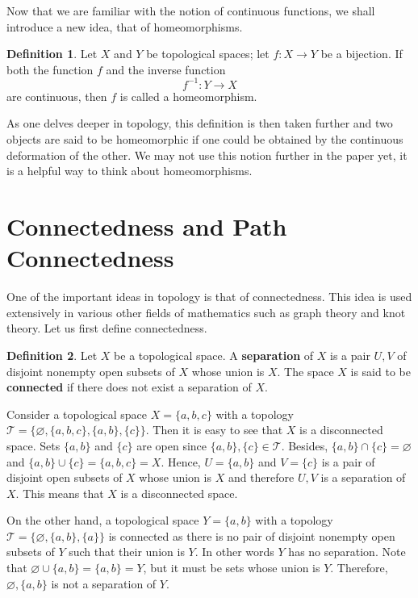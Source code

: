 \documentclass[a4paper, twocolumn]{article}
\newcommand{\topology}{\mathcal{T}}              %
\renewcommand{\emptyset}{\varnothing}            %
\newcommand\und[1]{\underline{\smash{#1}}}       %
\theoremstyle{definition}
\newtheorem*{definition}{Definition}
\begin{document}
\medskip

Now that we are familiar with the notion of continuous functions, we shall introduce a new idea, that of homeomorphisms.

\begin{definition}
\cite{7} Let $X$ and $Y$ be topological spaces; let $f : X \to Y$ be a bijection. If both the function $f$
and the inverse function
$$f^{-1} : Y \to X$$
are continuous, then $f$ is called a homeomorphism.
\end{definition}

As one delves deeper in topology, this definition is then taken further and two objects are said to be homeomorphic if
one could be obtained by the continuous deformation of the other. We may not use this notion further in the paper yet,
it is a helpful way to think about homeomorphisms.


\section*{\centering Connectedness and Path Connectedness}
One of the important ideas in topology is that of connectedness.
This idea is used extensively in various other fields of mathematics such as graph theory and knot theory.
Let us first define connectedness.

\begin{definition}
\cite{8} Let $X$ be a topological space. A \textbf{separation} of $X$ is a pair $U, V$ of disjoint
nonempty open subsets of $X$ whose union is $X$. The space $X$ is said to be \textbf{connected}
if there does not exist a separation of $X$.
\end{definition}

Consider a topological space $X = \{a, b, c\}$ with a topology $\topology = \{\emptyset, \{a, b, c\}, \{a, b\}, \{c\}\}$.
Then it is easy to see that $X$ is a disconnected space. Sets $\{a, b\}$ and $\{c\}$ are open since $\{a, b\}, \{c\} \in \topology$.
Besides, $\{a, b\} \cap \{c\} = \emptyset$ and $\{a, b\} \cup \{c\} = \{a, b, c\} = X$.
Hence, $U = \{a, b\}$ and $V = \{c\}$ is a pair of disjoint open subsets of $X$ whose union is $X$
and therefore $U, V$ is a separation of $X$. This means that $X$ is a disconnected space.

\medskip

On the other hand, a topological space $Y = \{a, b\}$ with a topology $\topology = \{\emptyset, \{a, b\}, \{a\}\}$
is connected as there is no pair of disjoint nonempty open subsets of $Y$ such that their union is $Y$.
In other words $Y$ has no separation. Note that $\emptyset \cup \{a, b\} = \{a, b\} = Y$, but it must be \und{nonempty}
sets whose union is $Y$. Therefore, $\emptyset, \{a, b\}$ is not a separation of $Y$.
\end{document}
